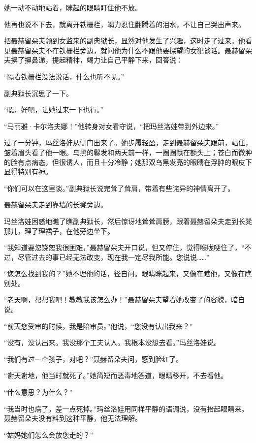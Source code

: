 \documentclass[12pt,UTF-8,openany]{ctexbook}
\begin{document}
\begin{normalsize}
    她一动不动地站着，眯起的眼睛盯住他不放。
    
    他再也说不下去，就离开铁栅栏，竭力忍住翻腾着的泪水，不让自己哭出声来。
    
    把聂赫留朵夫领到女监来的副典狱长，显然对他发生了兴趣，这时走了过来。他看见聂赫留朵夫不在铁栅栏旁边，就问他为什么不跟他要探望的女犯谈话。聂赫留朵夫擤了擤鼻涕，提起精神，竭力让自己平静下来，回答说：
    
    “隔着铁栅栏没法说话，什么也听不见。”
    
    副典狱长沉思了一下。
    
    “嗯，好吧，让她过来一下也行。”
    
    “马丽雅·卡尔洛夫娜！”他转身对女看守说，“把玛丝洛娃带到外边来。”
    
    过了一分钟，玛丝洛娃从侧门出来了。她步履轻盈，走到聂赫留朵夫跟前，站住，皱着眉头看了他一眼。乌黑的鬈发和两天前一样，一圈圈飘在额头上；苍白而微肿的脸有点病态，但很诱人，而且十分冷静；她那双乌黑发亮的眼睛在浮肿的眼皮下显得特别有神。
    
    “你们可以在这里谈。”副典狱长说完耸了耸肩，带着有些诧异的神情离开了。
    
    聂赫留朵夫走到靠墙的长凳旁边。
    
    玛丝洛娃困惑地瞧了瞧副典狱长，然后惊讶地耸耸肩膀，跟着聂赫留朵夫走到长凳那儿，理了理裙子，在他旁边坐下。
    
    “我知道要您饶恕我很困难，”聂赫留朵夫开口说，但又停住，觉得喉咙哽住了，“不过，尽管过去的事已经无法改变，现在我一定尽我所能。您说说……”
    
    “您怎么找到我的？”她不理他的话，径自问。眼睛眯起来，又像在瞧他，又像在瞧别处。
    
    “老天啊，帮帮我吧！教教我该怎么办！”聂赫留朵夫望着她改变了的容貌，暗自说。
    
    “前天您受审的时候，我是陪审员。”他说，“您没有认出我来？”
    
    “没有，没认出来。我没那个工夫认人。我根本没想去看。”玛丝洛娃说。
    
    “我们有过一个孩子，对吧？”聂赫留朵夫问，感到脸红了。
    
    “谢天谢地，他当时就死了。”她简短而恶毒地答道，眼睛移开，不去看他。
    
    “什么意思？为什么？”
    
    “我当时也病了，差一点死掉。”玛丝洛娃用同样平静的语调说，没有抬起眼睛来。聂赫留朵夫没有料到这种平静，他无法理解。
    
    “姑妈她们怎么会放您走的？”
    

\end{normalsize}
\end{document}
